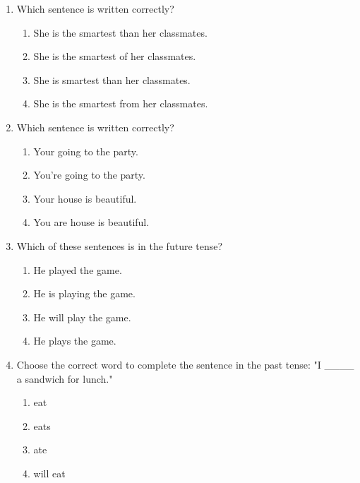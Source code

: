 \documentclass[12pt]{article}
\begin{document}
\begin{enumerate}
    \vspace{0.5cm}

    \item Which sentence is written correctly?

    \begin{enumerate}[label=\Alph*.]
        \item She is the smartest than her classmates.
        \item She is the smartest of her classmates.
        \item She is smartest than her classmates.
        \item She is the smartest from her classmates.
    \end{enumerate}

    \vspace{0.5cm}

    \item Which sentence is written correctly?

    \begin{enumerate}[label=\Alph*.]
        \item Your going to the party.
        \item You’re going to the party.
        \item Your house is beautiful.
        \item You are house is beautiful.
    \end{enumerate}

    \vspace{0.5cm}

    \item Which of these sentences is in the future tense?

    \begin{enumerate}[label=\Alph*.]
        \item He played the game.
        \item He is playing the game.
        \item He will play the game.
        \item He plays the game.
    \end{enumerate}

    \vspace{0.5cm}

    \item Choose the correct word to complete the sentence in the past tense:  
    "I \_\_\_\_ a sandwich for lunch."

    \begin{enumerate}[label=\Alph*.]
        \item eat
        \item eats
        \item ate
        \item will eat
    \end{enumerate}


\end{enumerate}
\end{document}
